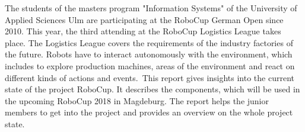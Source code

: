 The students of the masters program "Information Systems" of the University of Applied Sciences Ulm are participating at the RoboCup German Open since 2010. This year, the third attending at the RoboCup Logistics League takes place. The Logistics League covers the requirements of the industry factories of the future. Robots have to interact autonomously with the environment, which includes to explore production machines, areas of the environment and react on different kinds of actions and events.\
This report gives insights into the current state of the project RoboCup. It describes the components, which will be used in the upcoming RoboCup 2018 in Magdeburg. The report helps the junior members to get into the project and provides an overview on the whole project state.

